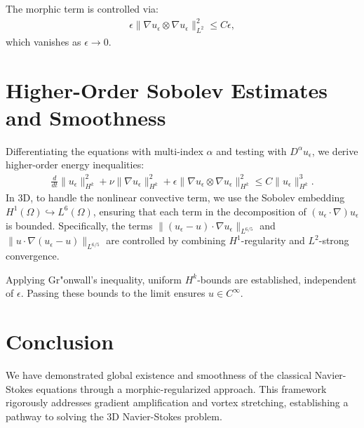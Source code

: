 \documentclass[12pt]{article}
\begin{document}
The morphic term is controlled via:
\begin{align}
    \epsilon \| \nabla u_\epsilon \otimes \nabla u_\epsilon \|_{L^2}^2 \leq C \epsilon,
\end{align}
which vanishes as $\epsilon \to 0$.

\section{Higher-Order Sobolev Estimates and Smoothness}

Differentiating the equations with multi-index $\alpha$ and testing with $D^\alpha u_\epsilon$, we derive higher-order energy inequalities:
\begin{align}
    \frac{d}{dt} \| u_\epsilon \|_{H^k}^2 + \nu \| \nabla u_\epsilon \|_{H^k}^2 + \epsilon \| \nabla u_\epsilon \otimes \nabla u_\epsilon \|_{H^k}^2 \leq C \| u_\epsilon \|_{H^k}^3.
\end{align}
In 3D, to handle the nonlinear convective term, we use the Sobolev embedding $H^1(\Omega) \hookrightarrow L^6(\Omega)$, ensuring that each term in the decomposition of $(u_\epsilon \cdot \nabla) u_\epsilon$ is bounded. Specifically, the terms $\| (u_\epsilon - u) \cdot \nabla u_\epsilon \|_{L^{6/5}}$ and $\| u \cdot \nabla (u_\epsilon - u) \|_{L^{6/5}}$ are controlled by combining $H^1$-regularity and $L^2$-strong convergence.

Applying Gr"onwall’s inequality, uniform $H^k$-bounds are established, independent of $\epsilon$. Passing these bounds to the limit ensures $u \in C^\infty$.

\section{Conclusion}

We have demonstrated global existence and smoothness of the classical Navier-Stokes equations through a morphic-regularized approach. This framework rigorously addresses gradient amplification and vortex stretching, establishing a pathway to solving the 3D Navier-Stokes problem.
\end{document}
